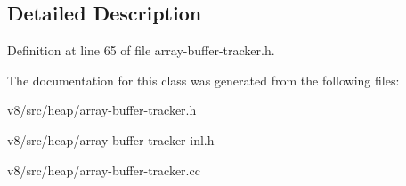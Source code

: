 \subsection{Detailed Description}


Definition at line 65 of file array-\/buffer-\/tracker.\+h.



The documentation for this class was generated from the following files\+:\begin{DoxyCompactItemize}
\item 
v8/src/heap/array-\/buffer-\/tracker.\+h\item 
v8/src/heap/array-\/buffer-\/tracker-\/inl.\+h\item 
v8/src/heap/array-\/buffer-\/tracker.\+cc\end{DoxyCompactItemize}
